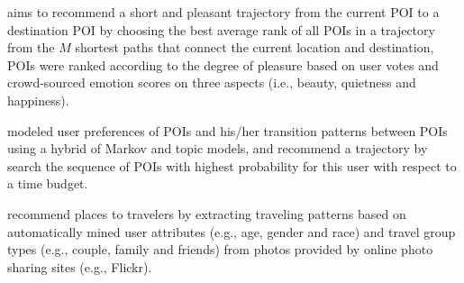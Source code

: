\cite{ht14} aims to recommend a short and pleasant trajectory from the current POI to a destination POI by choosing the best average rank 
of all POIs in a trajectory from the $M$ shortest paths that connect the current location and destination,
POIs were ranked according to the degree of pleasure based on user votes and  crowd-sourced emotion scores on three aspects 
(i.e., beauty, quietness and happiness).

\cite{geophoto13} modeled user preferences of POIs and his/her transition patterns between POIs using a hybrid of 
Markov and topic models, and recommend a trajectory by search the sequence of POIs with highest probability for this user 
with respect to a time budget.

\cite{travel13} recommend places to travelers by extracting traveling patterns based on automatically mined user attributes 
(e.g., age, gender and race) and travel group types (e.g., couple, family and friends) from photos provided by online photo 
sharing sites (e.g., Flickr).
